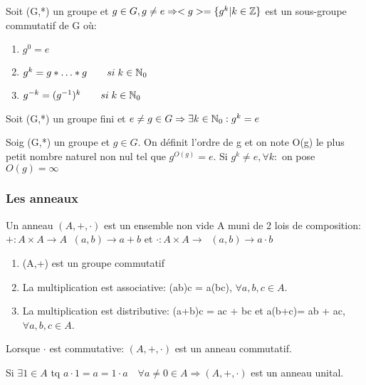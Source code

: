 \begin{prop}
Soit (G,*) un groupe et $g\in G, g \neq e \Rightarrow <g> = \{ g^k | k \in \mathbb{Z} \}$ est un sous-groupe commutatif de G où:
	\begin{enumerate}
		\item $g^0 = e$
		\item $g^k = g*\ldots*g \qquad si\; k\in \mathbb{N}_0$
		\item $g^{-k} = (g^{-1})^k \qquad si\; k\in \mathbb{N}_0$
	\end{enumerate}
\end{prop}

\begin{prop}
Soit (G,*) un groupe fini et $e \neq g \in G \Rightarrow \exists k \in \mathbb{N}_0: g^k = e$
\end{prop}

\begin{defn}
Soig (G,*) un groupe et $g\in G$. On définit l'ordre de g et on note O(g) le plus petit nombre naturel non nul tel que $g^{O(g)}=e$. Si $g^k \neq e, \forall k:$ on pose $O(g) = \infty$
\end{defn}

\subsubsection{Les anneaux}

\begin{defn}
Un anneau $(A,+,\cdot)$ est un ensemble non vide A muni de 2 lois de composition: $+ : A \times A \rightarrow A \;\; (a,b) \rightarrow a+b$ et $\cdot : A \times A \rightarrow \;\; (a,b) \rightarrow a\cdot b$

\begin{enumerate}
	\item (A,+) est un groupe commutatif
	\item La multiplication est associative: (ab)c = a(bc), $\forall a,b,c \in A$.
	\item La multiplication est distributive: (a+b)c = ac + bc et a(b+c)= ab + ac, $\forall a,b,c \in A$.
\end{enumerate}
\end{defn}

\begin{defn}
Lorsque $\cdot$ est commutative: $(A,+,\cdot)$ est un anneau commutatif.

Si $\exists 1 \in A$ tq $a\cdot 1 = a = 1 \cdot a \quad \forall a \neq 0 \in A \Rightarrow (A,+,\cdot)$ est un anneau unital.
\end{defn}

